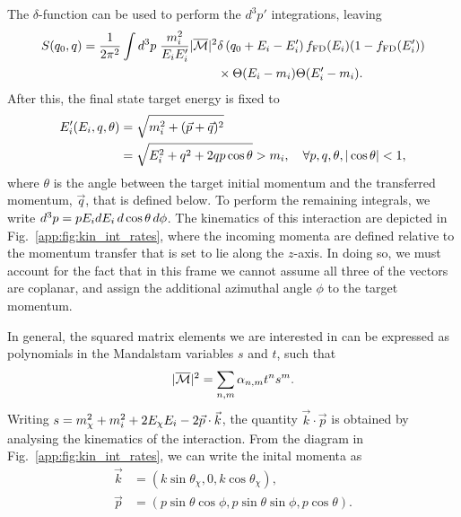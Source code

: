 The $\delta$-function can be used to perform the $d^3p'$ integrations, leaving
\begin{equation}
    \begin{split}
        S(q_0, q) = \frac{1}{2\pi^2}\int d^3p \; \frac{m_i^2}{E_i E_i'}|\overline{\mathcal M}|^2 &\delta\left( q_0 + E_i - E_i'\right) f_{\rm FD}(E_i)(1 - f_{\rm FD}(E_i'))\\
        &\times\Theta(E_i- m_i)\Theta(E_i' - m_i).
    \end{split}
\end{equation}
After this, the final state target energy is fixed to
\begin{align}
    E_i'(E_i,q,\theta) &= \sqrt{m_i^2+(\vec{p}+\vec{q})^2}\\
    &= \sqrt{E_i^2+q^2+2qp\cos\theta} > m_i, \quad\forall p,q,\theta, |\cos\theta|<1,
\end{align}
where $\theta$ is the angle between the target initial momentum and the transferred momentum, $\vec{q}$, that is defined below. To perform the remaining integrals, we write $d^3 p  = p E_i dE_i\, d\cos\theta\,d\phi$. The kinematics of this interaction are depicted in Fig.~\ref{app:fig:kin_int_rates}, where the incoming momenta are defined relative to the momentum transfer that is set to lie along the $z$-axis.  In doing so, we must account for the fact that in this frame we cannot assume all three of the vectors are coplanar, and assign the additional azimuthal angle $\phi$ to the target momentum. 

In general, the squared matrix elements we are interested in can be expressed as polynomials in the Mandalstam variables $s$ and $t$, such that
\begin{equation}
    |\overline{\mathcal M}|^2 = \sum_{n,m}\alpha_{n,m} t^n s^m.
\end{equation}
Writing $s = m_\chi^2 + m_i^2 + 2E_\chi E_i - 2\vec{p}\cdot \vec{k}$, the quantity $\vec{k}\cdot\vec{p}$ is obtained by analysing the kinematics of the interaction. From the diagram in Fig.~\ref{app:fig:kin_int_rates}, we can write the inital momenta as
\begin{align}
    \vec{k} & = (k\sin\theta_\chi, 0, k\cos\theta_\chi),\\
    \vec{p} & = (p\sin\theta \cos\phi, p\sin\theta \sin\phi, p\cos\theta).
\end{align}

